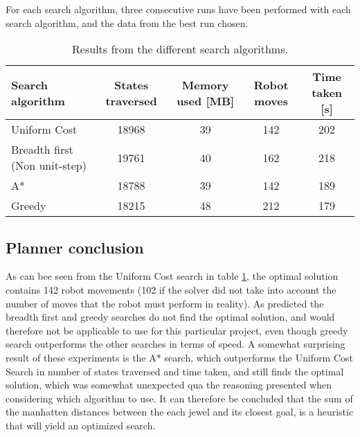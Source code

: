 For each search algorithm, three consecutive runs have been performed with each search algorithm, and the data from the best run chosen.\\

\begin{table}[h!]
	\centering
	\begin{tabular}{| l | c | c | c | c | }
		\hline
			Search algorithm	& States traversed & Memory used [MB] & Robot moves & Time taken [s]\\ \hline
	    	Uniform Cost & 18968 			& 39 		 & 142 	& 202\\\hline
		    Breadth first (Non unit-step)	& 19761 			& 40 		 & 162 	& 218\\\hline
		    A*		& 18788 			& 39 		 & 142 	& 189 \\\hline
	    	Greedy 		& 18215 			& 48 		 & 212 	& 179 \\
		\hline
	\end{tabular}
	\label{tbl:searchresults}
	\caption{Results from the different search algorithms.}
\end{table}

\subsection{Planner conclusion}
As can bee seen from the Uniform Cost search in table \ref{tbl:searchresults}, the optimal solution contains 142 robot movements (102 if the solver did not take into account the number of moves that the robot must perform in reality). As predicted the breadth first and greedy searches do not find the optimal solution, and would therefore not be applicable to use for this particular project, even though greedy search outperforms the other searches in terms of speed. A somewhat surprising result of these experiments is the A* search, which outperforms the Uniform Cost Search in number of states traversed and time taken, and still finds the optimal solution, which was somewhat unexpected qua the reasoning presented when considering which algorithm to use. It can therefore be concluded that the sum of the manhatten distances between the each jewel and its closest goal, is a heuristic that will yield an optimized search.
